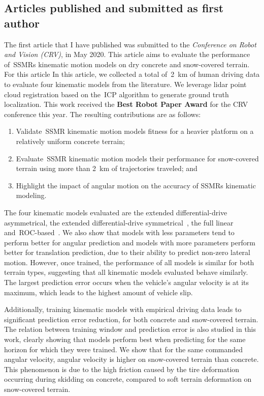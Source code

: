 \subsection{Articles published and submitted as first author}
\begin{center}
	\textbf{}
\end{center}
The first article that I have published was submitted to the \emph{Conference on Robot and Vision (CRV)}, in May 2020.
This article aims to evaluate the performance of~\acp{SSMR} kinematic motion models on dry concrete and snow-covered terrain.
For this article
In this article, we collected a total of~\SI{2}{\kilo\meter} of human driving data to evaluate four kinematic models from the literature.
We leverage lidar point cloud registration based on the~\ac{ICP} algorithm to generate ground truth localization.
This work received the \textbf{Best Robot Paper Award} for the CRV conference this year.
The resulting contributions are as follows:
\begin{enumerate}
	\item Validate~\ac{SSMR} kinematic motion models fitness for a heavier platform on a relatively uniform concrete terrain;
	\item Evaluate~\ac{SSMR} kinematic motion models their performance for snow-covered terrain using more than \SI{2}{\kilo\meter} of trajectories traveled; and
	\item Highlight the impact of angular motion on the accuracy of \acp{SSMR} kinematic modeling.
\end{enumerate}

The four kinematic models evaluated are the extended differential-drive asymmetrical, the extended differential-drive symmetrical~\citep{Mandow2007}, the full linear~\citep{Anousaki2004} and~\ac{ROC}-based~\citep{Wang2015}.
We also show that models with less parameters tend to perform better for angular prediction and models with more parameters perform better for translation prediction, due to their ability to predict non-zero lateral motion.
However, once trained, the performance of all models is similar for both terrain types, suggesting that all kinematic models evaluated behave similarly.
The largest prediction error occurs when the vehicle's angular velocity is at its maximum, which leads to the highest amount of vehicle slip.

Additionally, training kinematic models with empirical driving data leads to significant prediction error reduction, for both concrete and snow-covered terrain.
The relation between training window and prediction error is also studied in this work, clearly showing that models perform best when predicting for the same horizon for which they were trained.
We show that for the same commanded angular velocity, angular velocity is higher on snow-covered terrain than concrete. 
This phenomenon is due to the high friction caused by the tire deformation occurring during skidding on concrete, compared to soft terrain deformation on snow-covered terrain.

